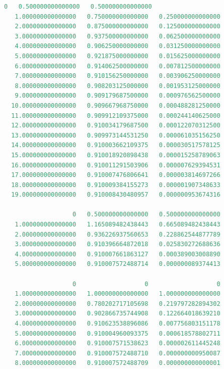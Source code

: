 \begin{lstlisting}[language = MATLAB]
                   0   0.500000000000000   0.500000000000000
   1.000000000000000   0.750000000000000   0.250000000000000
   2.000000000000000   0.875000000000000   0.125000000000000
   3.000000000000000   0.937500000000000   0.062500000000000
   4.000000000000000   0.906250000000000   0.031250000000000
   5.000000000000000   0.921875000000000   0.015625000000000
   6.000000000000000   0.914062500000000   0.007812500000000
   7.000000000000000   0.910156250000000   0.003906250000000
   8.000000000000000   0.908203125000000   0.001953125000000
   9.000000000000000   0.909179687500000   0.000976562500000
  10.000000000000000   0.909667968750000   0.000488281250000
  11.000000000000000   0.909912109375000   0.000244140625000
  12.000000000000000   0.910034179687500   0.000122070312500
  13.000000000000000   0.909973144531250   0.000061035156250
  14.000000000000000   0.910003662109375   0.000030517578125
  15.000000000000000   0.910018920898438   0.000015258789063
  16.000000000000000   0.910011291503906   0.000007629394531
  17.000000000000000   0.910007476806641   0.000003814697266
  18.000000000000000   0.910009384155273   0.000001907348633
  19.000000000000000   0.910008430480957   0.000000953674316

                   0   0.500000000000000   0.500000000000000
   1.000000000000000   1.165089482438443   0.665089482438443
   2.000000000000000   0.936226937560653   0.228862544877789
   3.000000000000000   0.910396664872018   0.025830272688636
   4.000000000000000   0.910007661863127   0.000389003008890
   5.000000000000000   0.910007572488714   0.000000089374413

                   0                   0                   0
   1.000000000000000   1.000000000000000   1.000000000000000
   2.000000000000000   0.780202717105698   0.219797282894302
   3.000000000000000   0.902866735744908   0.122664018639210
   4.000000000000000   0.910623538896086   0.007756803151178
   5.000000000000000   0.910004960093375   0.000618578802711
   6.000000000000000   0.910007571538623   0.000002611445248
   7.000000000000000   0.910007572488710   0.000000000950087
   8.000000000000000   0.910007572488709   0.000000000000001
\end{lstlisting}
